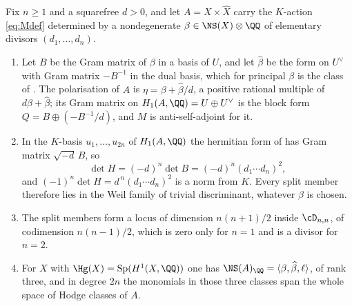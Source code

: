 \begin{proposition}\label{prop:splitgeom}
Fix $n\ge1$ and a squarefree $d>0$, and let $A=X\times\widehat{X}$ carry the
$K$-action \eqref{eq:Mdef} determined by a nondegenerate
$\beta\in\NS(X)\otimes\QQ$ of elementary divisors $(d_{1},\dots,d_{n})$.
\begin{enumerate}[label=\textup{(\roman*)},nosep]
\item Let $B$ be the Gram matrix of $\beta$ in a basis of $U$, and let
  $\widehat\beta$ be the form on $U^{\vee}$ with Gram matrix $-B^{-1}$ in the
  dual basis, which for principal $\beta$ is the class of
  . The polarisation of $A$ is
  $\eta=\beta+\widehat{\beta}/d$, a positive rational multiple of
  $d\beta+\widehat\beta$; its Gram matrix on $H_{1}(A,\QQ)=U\oplus U^{\vee}$
  is the block form $Q=B\oplus(-B^{-1}/d)$, and $M$ is anti-self-adjoint for
  it.
\item In the $K$-basis $u_{1},\dots,u_{2n}$ of $H_{1}(A,\QQ)$ the hermitian
  form of  has Gram matrix $\sqrt{-d}\,B$, so
  \[
    \det H=(-d)^{n}\det B=(-d)^{n}(d_{1}\cdots d_{n})^{2},
  \]
  and $(-1)^{n}\det H=d^{\,n}(d_{1}\cdots d_{n})^{2}$ is a norm from $K$.
  Every split member therefore lies in the Weil family of trivial
  discriminant, whatever $\beta$ is chosen.
\item The split members form a locus of dimension $n(n+1)/2$ inside
  $\cD_{n,n}$, of codimension $n(n-1)/2$, which is zero only for $n=1$ and is
  a divisor for $n=2$.
\item For $X$ with $\Hg(X)=\mathrm{Sp}(H^{1}(X,\QQ))$ one has
  $\NS(A)_{\QQ}=\langle\beta,\widehat{\beta},\ell\rangle$, of rank three, and
  in degree $2n$ the monomials in those three classes span the whole space of
  Hodge classes of $A$.
\end{enumerate}
\end{proposition}

